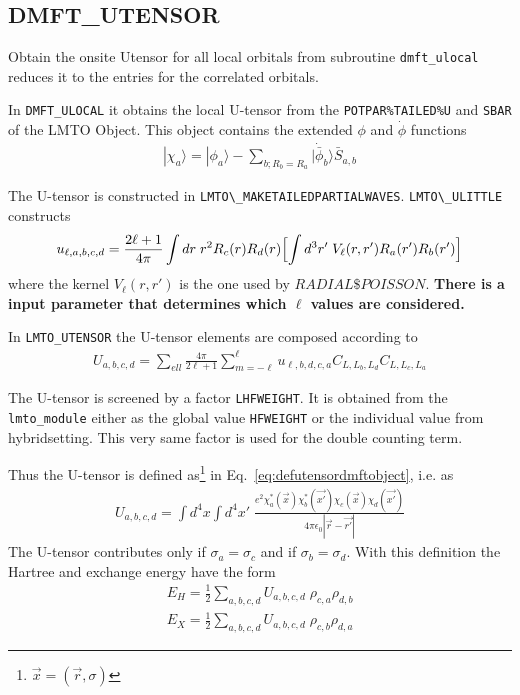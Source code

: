 \documentclass[11pt,a4paper]{report}
\begin{document}
\subsection{DMFT\_UTENSOR}
Obtain the onsite Utensor for all local orbitals from subroutine
\verb|dmft_ulocal| reduces it to the entries for the correlated
orbitals.

In \verb|DMFT_ULOCAL| it obtains the local U-tensor from the
\verb|POTPAR%TAILED%U| and \verb|SBAR| of the LMTO Object. This object
contains the extended $\phi$ and $\dot{\phi}$ functions
\begin{eqnarray}
|\chi_a\rangle=|\phi_a\rangle-
\sum_{b; R_b=R_a}|\dot{\bar{\phi}}_b\rangle \bar{S}_{a,b}
\end{eqnarray}


The U-tensor is constructed in \verb|LMTO\_MAKETAILEDPARTIALWAVES|.
\verb|LMTO\_ULITTLE| constructs
\begin{eqnarray}
u_{\ell,a,b,c,d}
=\frac{2\ell+1}{4\pi}
\int dr\; r^2R_c(r)R_d(r)\Bigl[\int d^3r'\;V_\ell(r,r')R_a(r')R_b(r')\Bigr]
\end{eqnarray}
where the kernel $V_\ell(r,r')$ is the one used by $RADIAL\$POISSON$.
\textbf{There is a input parameter that determines which $\ell$ values are
considered.}

In \verb|LMTO_UTENSOR| the U-tensor elements are composed according to
\begin{eqnarray}
U_{a,b,c,d}=\sum_{ell}\frac{4\pi}{2\ell+1}\sum_{m=-\ell}^\ell
u_{\ell,b,d,c,a} C_{L,L_b,L_d}C_{L,L_c,L_a}
\end{eqnarray}

The U-tensor is screened by a factor \verb|LHFWEIGHT|. It is obtained
from the \verb|lmto_module| either as the global value \verb|HFWEIGHT|
or the individual value from hybridsetting. This very same factor is
used for the double counting term.

Thus the U-tensor is defined as\footnote{$\vec{x}=(\vec{r},\sigma)$}
in Eq.~\ref{eq:defutensordmftobject}, i.e. as
\begin{eqnarray}
U_{a,b,c,d}=\int d^4x\int d^4x'\;
\frac{e^2\chi^*_a(\vec{x})\chi^*_b(\vec{x'})\chi_c(\vec{x})\chi_d(\vec{x'})}
{4\pi\epsilon_0|\vec{r}-\vec{r'}|}
\end{eqnarray}
The U-tensor contributes only if $\sigma_a=\sigma_c$ and if
$\sigma_b=\sigma_d$.
With this definition the Hartree and exchange  energy have the form
\begin{eqnarray}
E_H=\frac{1}{2}\sum_{a,b,c,d}U_{a,b,c,d}\;\rho_{c,a}\rho_{d,b}
\nonumber\\
E_X=\frac{1}{2}\sum_{a,b,c,d}U_{a,b,c,d}\;\rho_{c,b}\rho_{d,a}
\end{eqnarray}
\end{document}
